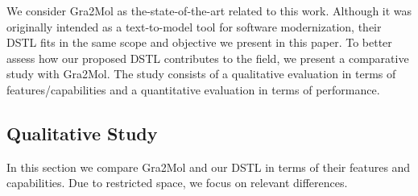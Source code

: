 \documentclass{llncs}
\begin{document}
We consider Gra2Mol as the-state-of-the-art related to this work. Although it was originally intended as a text-to-model tool for software modernization, their DSTL fits in the same scope and objective we present in this paper. To better assess how our proposed DSTL contributes to the field, we present a comparative study with Gra2Mol. The study consists of a qualitative evaluation in terms of features/capabilities and a quantitative evaluation in terms of performance.

\subsection{Qualitative Study}
\label{subsec:featuresComparison}

In this section we compare Gra2Mol and our DSTL in terms of their features and capabilities. Due to restricted space, we focus on relevant differences.



\end{document}

